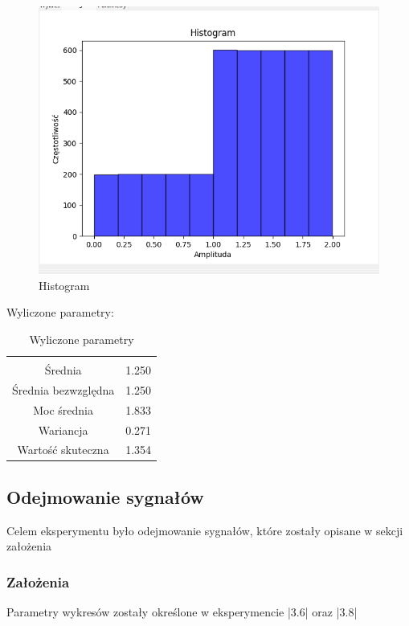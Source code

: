 \documentclass{article}
\begin{document}
\begin{figure}[h!]
    \centering
    \includegraphics[width=\textwidth]{img/add/hist.png}
    \caption{Histogram}
\end{figure}
\FloatBarrier
Wyliczone parametry:
\begin{table}[h!]
    \centering
    \vspace{0.2cm}
    \begin{tabular}{|c|c|}
        \hline\hline\\[-0.4cm]
        Średnia & 1.250  \\
        \hline
        Średnia bezwzględna & 1.250  \\
        \hline
        Moc średnia & 1.833  \\
        \hline
        Wariancja & 0.271 \\
        \hline
        Wartość skuteczna & 1.354 \\
        \hline
    \end{tabular}
    \caption{Wyliczone parametry}
    \label{add}
\end{table}  

\subsection{Odejmowanie sygnałów} \label{sub} 
Celem eksperymentu było odejmowanie sygnałów, które zostały opisane w sekcji założenia

\subsubsection{Założenia} 
    Parametry wykresów zostały określone w eksperymencie |3.6| oraz |3.8|
\end{document}
